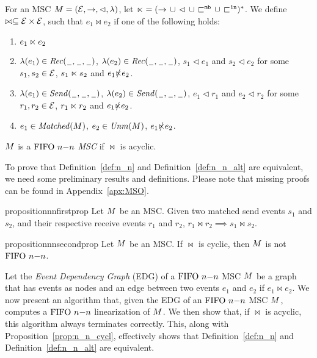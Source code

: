 \begin{definition} [$\nn$ alternative]\label{def:n_n_alt}
	For an MSC $M = (\mathcal{E},\to,\lhd,\lambda)$, let ${\ltimes} = ({\to} \,\cup\, {\lhd} \,\cup\, {\sqsubset^{\mathtt{mb}}} \,\cup\, {\sqsubset^{\mathtt{1n}}})^\ast$. We define  $\bowtie \subseteq \mathcal{E} \times \mathcal{E}$,  such that $e_1 \bowtie e_2$ if one of the following holds:
	\begin{enumerate}%
		\item $e_1 \ltimes e_2$
		\item $\lambda(e_1) \in {\mathit{Rec}(\hspace{0.1em}\underline{\hspace{0.5em}}\hspace{0.1em},\hspace{0.1em}\underline{\hspace{0.5em}}\hspace{0.1em},\hspace{0.1em}\underline{\hspace{0.5em}}\hspace{0.1em})}$, $\lambda(e_2) \in {\mathit{Rec}(\hspace{0.1em}\underline{\hspace{0.5em}}\hspace{0.1em},\hspace{0.1em}\underline{\hspace{0.5em}}\hspace{0.1em},\hspace{0.1em}\underline{\hspace{0.5em}}\hspace{0.1em})}$, $s_1 \lhd e_1$ and $s_2 \lhd e_2$ for some $s_1,s_2 \in \mathcal{E}$, $s_1 \ltimes s_2$ and $e_1 \slashed{\ltimes} e_2$.
		\item $\lambda(e_1) \in {\mathit{Send}(\hspace{0.1em}\underline{\hspace{0.5em}}\hspace{0.1em},\hspace{0.1em}\underline{\hspace{0.5em}}\hspace{0.1em},\hspace{0.1em}\underline{\hspace{0.5em}}\hspace{0.1em})}$, $\lambda(e_2) \in {\mathit{Send}(\hspace{0.1em}\underline{\hspace{0.5em}}\hspace{0.1em},\hspace{0.1em}\underline{\hspace{0.5em}}\hspace{0.1em},\hspace{0.1em}\underline{\hspace{0.5em}}\hspace{0.1em})}$, $e_1 \lhd r_1$ and $e_2 \lhd r_2$ for some $r_1,r_2 \in \mathcal{E}$, $r_1 \ltimes r_2$ and $e_1 \slashed{\ltimes} e_2$.
		\item $e_1 \in \mathit{Matched}(M)$, $e_2 \in \mathit{Unm}(M)$, $e_1 \slashed{\ltimes} e_2$.
	\end{enumerate}

	$M $ is a \emph{$\nn$ MSC}
	if ${\bowtie}$ is acyclic.
\end{definition}

To prove that Definition~\ref{def:n_n} and Definition~\ref{def:n_n_alt} are equivalent, we need some preliminary results and definitions. Please note that missing proofs can be found in Appendix~\ref{apx:MSO}.

\begin{restatable}{proposition}{nnfirstprop}
	Let $M$ be an MSC. Given two matched send events $s_1$ and $s_2$, and their respective receive events $r_1$ and $r_2$, $r_1 \bowtie r_2 \implies s_1 \bowtie s_2$.
\end{restatable}

\begin{restatable}{proposition}{nnsecondprop}
\label{prop:n_n_cycl}
	Let $M$ be an MSC. If $\bowtie$ is cyclic, then $M$ is not $\nn$.
\end{restatable}

Let the \emph{Event Dependency Graph} (EDG) of a $\nn$ MSC $M$ be a graph that has events as nodes and an edge between two events $e_1$ and $e_2$ if $e_1 \bowtie e_2$. We now present an algorithm that, given the EDG of an $\nn$ MSC $M$, computes a $\nn$ linearization of $M$. We then show that, if $\bowtie$ is acyclic, this algorithm always terminates correctly. This, along with Proposition~\ref{prop:n_n_cycl}, effectively shows that Definition~\ref{def:n_n} and Definition~\ref{def:n_n_alt} are equivalent.

